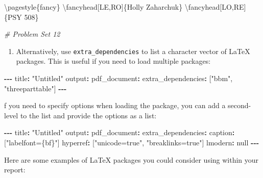 \documentclass[
]{book}
\newenvironment{Shaded}{\begin{snugshade}}{\end{snugshade}}
\newcommand{\CommentTok}[1]{\textcolor[rgb]{0.56,0.35,0.01}{\textit{#1}}}
\newcommand{\DecValTok}[1]{\textcolor[rgb]{0.00,0.00,0.81}{#1}}
\newcommand{\NormalTok}[1]{#1}
\newcommand{\SpecialCharTok}[1]{\textcolor[rgb]{0.81,0.36,0.00}{\textbf{#1}}}
\newcommand{\StringTok}[1]{\textcolor[rgb]{0.31,0.60,0.02}{#1}}
\providecommand{\tightlist}{%
  \setlength{\itemsep}{0pt}\setlength{\parskip}{0pt}}
\begin{document}
\begin{itemize}
\begin{itemize}
\begin{Shaded}
\begin{Highlighting}[]
\NormalTok{\textbackslash{}pagestyle\{fancy\}}
\NormalTok{\textbackslash{}fancyhead[LE,RO]\{Holly Zaharchuk\}}
\NormalTok{\textbackslash{}fancyhead[LO,RE]\{PSY }\DecValTok{508}\NormalTok{\}}

\CommentTok{\# Problem Set 12}
\end{Highlighting}
\end{Shaded}

    \begin{enumerate}
    \def\labelenumi{\arabic{enumi}.}
    \setcounter{enumi}{1}
    \tightlist
    \item
      Alternatively, use \texttt{extra\_dependencies} to list a character vector of LaTeX packages. This is useful if you need to load multiple packages:
    \end{enumerate}

\begin{Shaded}
\begin{Highlighting}[]
\SpecialCharTok{{-}{-}{-}}
\NormalTok{title}\SpecialCharTok{:} \StringTok{"Untitled"}
\NormalTok{output}\SpecialCharTok{:} 
\NormalTok{  pdf\_document}\SpecialCharTok{:}
\NormalTok{    extra\_dependencies}\SpecialCharTok{:}\NormalTok{ [}\StringTok{"bbm"}\NormalTok{, }\StringTok{"threeparttable"}\NormalTok{]}
\SpecialCharTok{{-}{-}{-}}
\end{Highlighting}
\end{Shaded}

    f you need to specify options when loading the package, you can add a second-level to the list and provide the options as a list:

\begin{Shaded}
\begin{Highlighting}[]
\SpecialCharTok{{-}{-}{-}}
\NormalTok{title}\SpecialCharTok{:} \StringTok{"Untitled"}
\NormalTok{output}\SpecialCharTok{:} 
\NormalTok{  pdf\_document}\SpecialCharTok{:}
\NormalTok{    extra\_dependencies}\SpecialCharTok{:}
\NormalTok{      caption}\SpecialCharTok{:}\NormalTok{ [}\StringTok{"labelfont=\{bf\}"}\NormalTok{]}
\NormalTok{      hyperref}\SpecialCharTok{:}\NormalTok{ [}\StringTok{"unicode=true"}\NormalTok{, }\StringTok{"breaklinks=true"}\NormalTok{]}
\NormalTok{      lmodern}\SpecialCharTok{:}\NormalTok{ null}
\SpecialCharTok{{-}{-}{-}}
\end{Highlighting}
\end{Shaded}

    Here are some examples of LaTeX packages you could consider using within your report:


\end{itemize}
\end{itemize}
\end{document}
